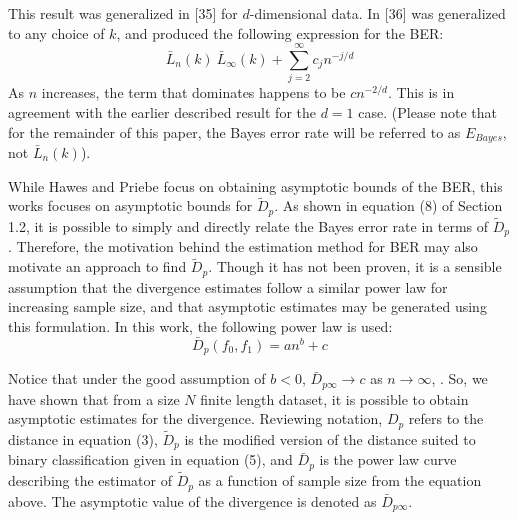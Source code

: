 \documentclass{article}
\begin{document}
	\indent This result was generalized in [35] for $d$-dimensional data. In [36] was generalized to any choice of $k$, and produced the following expression for the BER:
	\begin{equation}
	\bar{L}_n(k)~\bar{L}_\infty (k) + \sum_{j=2}^{\infty} c_j n^{-j/d}
	\end{equation}
	As $n$ increases, the term that dominates happens to be $cn^{-2/d}$. This is in agreement with the earlier described result for the $d=1$ case. (Please note that for the remainder of this paper, the Bayes error rate will be referred to as $E_{Bayes}$, not $\bar{L}_n(k)$).
	
	\indent While Hawes and Priebe focus on obtaining asymptotic bounds of the BER, this works focuses on asymptotic bounds for $\widetilde{D}_p$. As shown in equation (8) of Section 1.2, it is possible to simply and directly relate the Bayes error rate in terms of $\widetilde{D}_p$. Therefore, the motivation behind the estimation method for BER may also motivate an approach to find $\widetilde{D}_p$. Though it has not been proven, it is a sensible assumption that the divergence estimates follow a similar power law for increasing sample size, and that asymptotic estimates may be generated using this formulation. In this work, the following power law is used:
	\begin{equation}
		\bar{D}_p(f_0,f_1)=an^b+c
	\end{equation}

	\indent Notice that under the good assumption of $b<0$, $\bar{D}_{p\infty} \rightarrow c$ as $n \rightarrow \infty$, . So, we have shown that from a size $N$ finite length dataset, it is possible to obtain asymptotic estimates for the divergence. Reviewing notation, $D_p$ refers to the distance in equation (3), $\widetilde{D}_p$ is the modified version of the distance suited to binary classification given in equation (5), and $\bar{D}_p$ is the power law curve describing the estimator of $\widetilde{D}_p$ as a function of sample size from the equation above. The asymptotic value of the divergence is denoted as $\bar{D}_{p\infty}$.
	
\end{document}
